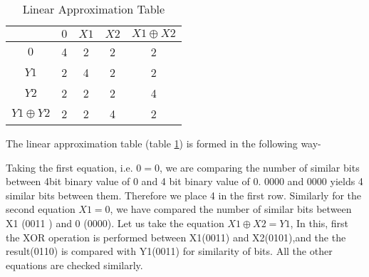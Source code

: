 \documentclass[12pt]{article}
\begin{document}
\begin{table}[H]
    \centering
    \begin{tabular}{|c|c|c|c|c|}
        \hline
        & $ 0 $ & $ X1 $ & $ X2 $ & $ X1 \oplus X2 $ \\
        \hline
        $ 0 $ & 4 & 2 & 2 & 2 \\
        \hline
        $ Y1 $ & 2 & 4 & 2 & 2 \\
        \hline
        $ Y2 $ & 2 & 2 & 2 & 4 \\
        \hline
        $ Y1 \oplus Y2 $ & 2 & 2 & 4 & 2 \\
        \hline
    \end{tabular}
    \caption{Linear Approximation Table}
    \label{lat}
\end{table}
The linear approximation table (table \ref{lat}) is formed in the following way- 

Taking the first equation, i.e. $ 0=0 $, we are comparing the number of similar bits between 4bit binary value of 0 and 4 bit binary value of 0. 0000 and 0000 yields 4 similar bits between them. Therefore we place 4 in the first row. Similarly for the second equation $ X1=0 $, we have compared the number of similar bits between X1 (0011 ) and 0 (0000). Let us take the equation $ X1 \oplus X2=Y1 $, In this, first the XOR operation is performed between X1(0011) and X2(0101),and the the result(0110) is compared with Y1(0011) for similarity of bits. All the other equations are checked similarly.  
\end{document}
